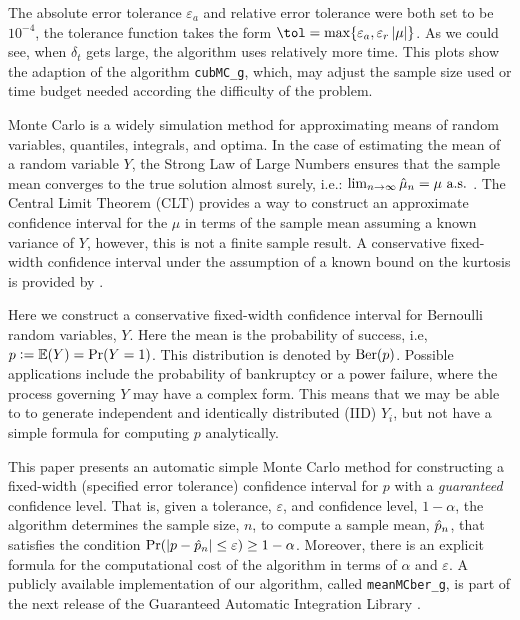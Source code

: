 \documentclass{iitthesis}
\begin{document}
The absolute error tolerance $\varepsilon_a$  and relative error tolerance were both set to be $10^{-4}$, the tolerance function takes the form $\tol = \max \{\varepsilon_a,\varepsilon_r \abs{\mu}\}$. As we could see, when $\delta_t$ gets large, the algorithm uses relatively more time. This plots show the adaption of the algorithm {\tt cubMC\_g}, which, may adjust the sample size used or time budget needed according the difficulty of the problem.

\label{chapter:meanMCberg}
Monte Carlo is a widely simulation method for approximating means of random variables, quantiles, integrals, and optima. In the case of estimating the mean of a random variable $Y$, the Strong Law of Large Numbers ensures that the sample mean converges to the true solution almost surely, i.e.: $\lim_{n \to \infty} \hat{\mu}_n =\mu \text{ a.s.}$ \cite[Theorem 20.1]{JP04}.  The Central Limit Theorem (CLT) provides a way to construct an approximate confidence interval for the $\mu$ in terms of the sample mean assuming a known variance of $Y$, however, this is not a finite sample result.  A conservative fixed-width confidence interval under the assumption of a known bound on the kurtosis is provided by \cite{HJLO12}.

Here we construct a conservative fixed-width confidence interval for Bernoulli random variables, $Y$. Here the mean is the probability of success, i.e,  $p:= \mathbb{E}(Y)=\Pr(Y=1)$.  This distribution is denoted by $\operatorname{Ber}(p)$.  Possible applications include the probability of bankruptcy or a power failure, where the process governing $Y$ may have a complex form.  This means that we may be able to to generate independent and identically distributed (IID) $Y_i$, but not have a simple formula for computing $p$ analytically. 

This paper presents an automatic simple Monte Carlo method for constructing a fixed-width (specified error tolerance) confidence interval for $p$ with a \textit{guaranteed} confidence level.  That is, given a tolerance, $\varepsilon$, and confidence level, $1-\alpha$, the algorithm determines the sample size, $n$, to compute a sample mean, $\hat{p}_n$, that satisfies the condition $\Pr(\left \lvert p-\hat{p}_n \right \rvert\leq \varepsilon) \geq 1-\alpha$.  Moreover, there is an explicit formula for the computational cost of the algorithm in terms of $\alpha$ and $\varepsilon$. A publicly available implementation of our algorithm, called {\tt meanMCber\_g}, is part of the next release of the Guaranteed Automatic Integration Library \cite{GAIL_1_3}.
\end{document}
